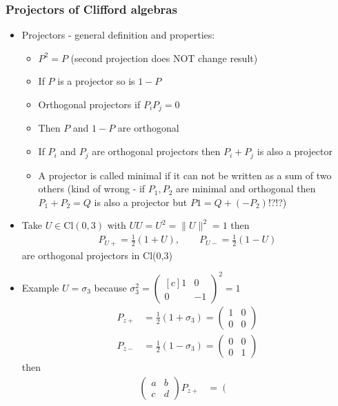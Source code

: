 \documentclass[../main.tex]{subfiles}
\begin{document}
\begin{itemize}
\subsubsection{Projectors of Clifford algebras}
\begin{itemize}
\item Projectors - general definition and properties:
\begin{itemize}
\item $P^2=P$ (second projection does NOT change result)
\item If $P$ is a projector so is $1-P$
\item Orthogonal projectors if $P_iP_j=0$
\item Then $P$ and $1-P$ are orthogonal
\item If $P_i$ and $P_j$ are orthogonal projectors then $P_i+P_j$ is also a projector
\item A projector is called minimal if it can  not be written as a sum of two others (kind of wrong - if $P_1, P_2$ are minimal and orthogonal then $P_1+P_2=Q$ is also a projector but $P1=Q+(-P_2)$!?!?)
\end{itemize}
\item Take $U\in\text{Cl}(0,3)$ with $UU=U^2=\|U\|^2=1$ then
\begin{align}
P_{U+}=\frac{1}{2}(1+U),\qquad P_{U-}=\frac{1}{2}(1-U)
\end{align}
are orthogonal projectors in Cl(0,3)
\item Example $U=\sigma_3$ because $\sigma_3^2=\left( 
\begin{smallmatrix*}[c]
    1 & 0 \\ 
    0 & -1 
\end{smallmatrix*} \right)^2=1$
\begin{align}
P_{z+}&=\frac{1}{2}(1+\sigma_3)
=\left(\begin{matrix}
1 & 0\\
0 & 0
\end{matrix}\right)\\
P_{z-}&=\frac{1}{2}(1-\sigma_3)
=\left(\begin{matrix}
0 & 0\\
0 & 1
\end{matrix}\right)
\end{align}
then
\begin{align}
\left(\begin{matrix}
a & b\\
c & d
\end{matrix}\right)P_{z+}
&=\left(\begin{matrix}

\end{matrix}
\end{align}
\end{itemize}
\end{itemize}
\end{document}
